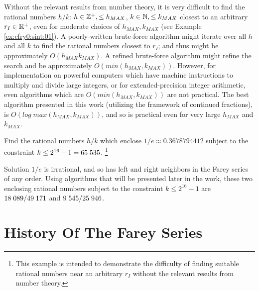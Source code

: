 Without the relevant results from number theory, it is
very difficult to find the rational numbers $h/k$:
$h \in {\mathbb{Z}^+}, \leq{} h_{MAX}$, $k \in {\mathbb{N}}, \leq k_{MAX}$
closest to
an arbitrary $r_I \in {\mathbb{R}^+}$, even for moderate
choices of $h_{MAX}, k_{MAX}$ (see Example \ref{ex:cfry0:sint:01}).
A poorly-written brute-force
algorithm might iterate over all $h$ and all $k$ to find the
rational numbers closest to $r_I$; and thus might be
approximately $O(h_{MAX} k_{MAX})$.  A refined brute-force
algorithm might refine the search and be approximately
$O(min(h_{MAX}, k_{MAX}))$.  However, for implementation on powerful
computers which have machine instructions to multiply and
divide large integers, or for extended-precision integer arithmetic, even algorithms
which are $O(min(h_{MAX}, k_{MAX}))$ are not  practical.  The best
algorithm presented in this work (utilizing the
framework of continued fractions), is $O(log \; max(h_{MAX}, k_{MAX}))$,
and so is practical even for very large $h_{MAX}$ and $k_{MAX}$.

\begin{vworkexamplestatement}
\label{ex:cfry0:sint:01}
Find the rational numbers
$h/k$ which enclose $1/e \approx 0.3678794412$
subject to the constraint $k \leq 2^{16} - 1 = 65\;{}535$.%
\footnote{This example is intended to demonstrate the difficulty of
finding suitable rational numbers near an arbitrary $r_I$ without the
relevant results from number theory.}
\end{vworkexamplestatement}
\begin{vworkexampleparsection}{Solution}
$1/e$ is irrational, and so has left and right neighbors in
the Farey series of any order.  Using algorithms that will be presented later in the
work, these two enclosing rational numbers subject to the
constraint $k \leq 2^{16}-1$ are
$18\;{}089/49\;{}171$
and
$9\;{}545/25\;{}946$.
\end{vworkexampleparsection}
\vworkexamplefooter{}

\section{History Of The Farey Series}

